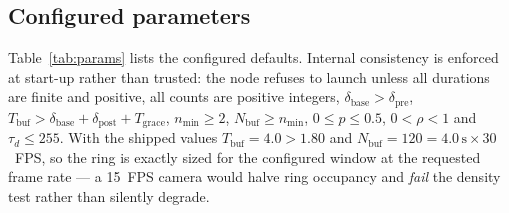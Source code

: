 \documentclass[conference]{IEEEtran}
\begin{document}
\subsection{Configured parameters}
Table~\ref{tab:params} lists the configured defaults. Internal consistency is enforced at start-up
rather than trusted: the node refuses to launch unless all durations are finite and positive, all
counts are positive integers, $\delta_{\mathrm{base}}>\delta_{\mathrm{pre}}$,
$T_{\mathrm{buf}}>\delta_{\mathrm{base}}+\delta_{\mathrm{post}}+T_{\mathrm{grace}}$,
$n_{\min}\ge2$, $N_{\mathrm{buf}}\ge n_{\min}$, $0\le p\le0.5$, $0<\rho<1$ and $\tau_d\le255$. With
the shipped values $T_{\mathrm{buf}}=4.0>1.80$ and $N_{\mathrm{buf}}=120=4.0\,\mathrm{s}\times30$~FPS,
so the ring is exactly sized for the configured window at the requested frame rate --- a 15~FPS camera
would halve ring occupancy and \emph{fail} the density test rather than silently degrade.
\end{document}
